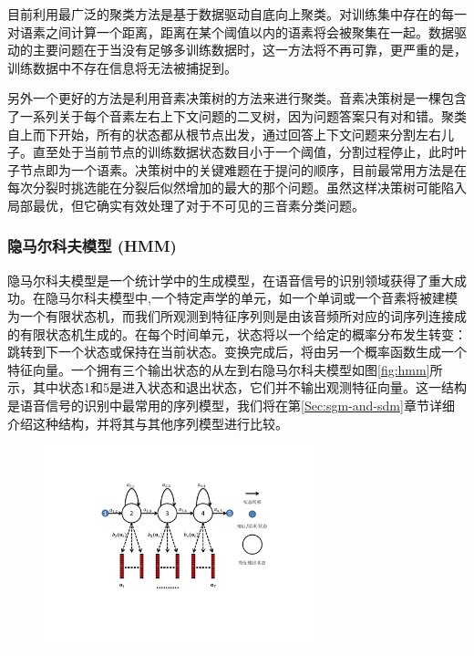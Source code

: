 目前利用最广泛的聚类方法是基于数据驱动自底向上聚类。对训练集中存在的每一对语素之间计算一个距离，距离在某个阈值以内的语素将会被聚集在一起。数据驱动的主要问题在于当没有足够多训练数据时，这一方法将不再可靠，更严重的是，训练数据中不存在信息将无法被捕捉到。

另外一个更好的方法是利用音素决策树的方法来进行聚类。音素决策树是一棵包含了一系列关于每个音素左右上下文问题的二叉树，因为问题答案只有对和错。聚类自上而下开始，所有的状态都从根节点出发，通过回答上下文问题来分割左右儿子。直至处于当前节点的训练数据状态数目小于一个阈值，分割过程停止，此时叶子节点即为一个语素。决策树中的关键难题在于提问的顺序，目前最常用方法是在每次分裂时挑选能在分裂后似然增加的最大的那个问题。虽然这样决策树可能陷入局部最优，但它确实有效处理了对于不可见的三音素分类问题。

\subsubsection{隐马尔科夫模型 (HMM)}
\label{sec:hmm}
隐马尔科夫模型是一个统计学中的生成模型，在语音信号的识别领域获得了重大成功。在隐马尔科夫模型中,一个特定声学的单元，如一个单词或一个音素将被建模为一个有限状态机，而我们所观测到特征序列则是由该音频所对应的词序列连接成的有限状态机生成的。在每个时间单元，状态将以一个给定的概率分布发生转变：跳转到下一个状态或保持在当前状态。变换完成后，将由另一个概率函数生成一个特征向量。一个拥有三个输出状态的从左到右隐马尔科夫模型如图\ref{fig:hmm}所示，其中状态1和5是进入状态和退出状态，它们并不输出观测特征向量。这一结构是语音信号的识别中最常用的序列模型，我们将在第\ref{Sec:sgm-and-sdm}章节详细介绍这种结构，并将其与其他序列模型进行比较。

\begin{figure}[!htp]
  \centering
    \captionstyle{\centering}
    \includegraphics[trim = 3cm 5cm 4cm 3cm, clip=true, width=0.7\textwidth]{figure/hmm.pdf}
\end{figure}

